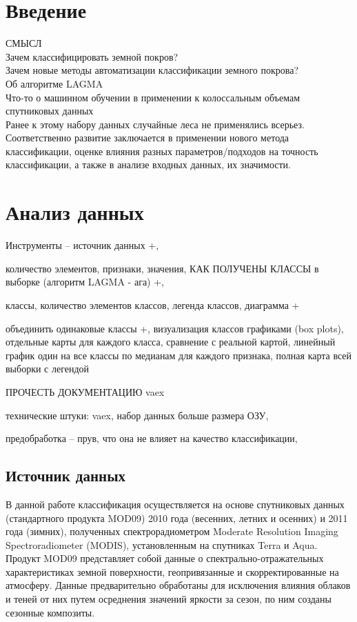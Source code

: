 \documentclass[14pt, a4paper, oneside]{extarticle}
\begin{document}
\tableofcontents
\newpage

\section{Введение}
СМЫСЛ \\
Зачем классифицировать земной покров? \\
Зачем новые методы автоматизации классификации земного покрова? \\
Об алгоритме LAGMA \\
Что-то о машинном обучении в применении к колоссальным объемам спутниковых данных \\

Ранее к этому набору данных случайные леса не применялись всерьез. Соответственно развитие заключается в применении нового метода классификации, оценке влияния разных параметров/подходов на точность классификации, а также в анализе входных данных, их значимости.

\newpage

\section{Анализ данных}
Инструменты -- источник данных +,

количество элементов, признаки, значения, КАК ПОЛУЧЕНЫ КЛАССЫ в выборке (алгоритм LAGMA - ага) +,

классы, количество элементов классов, легенда классов, диаграмма +

объединить одинаковые классы +, визуализация классов графиками (box plots), отдельные карты для каждого класса, сравнение с реальной картой, линейный график один на все классы по медианам для каждого признака, полная карта всей выборки с легендой

ПРОЧЕСТЬ ДОКУМЕНТАЦИЮ vaex

технические штуки: vaex, набор данных больше размера ОЗУ,

предобработка -- прув, что она не влияет на качество классификации,

\subsection{Источник данных}
В данной работе классификация осуществляется на основе спутниковых данных (стандартного продукта MOD09) 2010 года (весенних, летних и осенних) и 2011 года (зимних), полученных спектрорадиометром Moderate Resolution Imaging Spectroradiometer (MODIS), установленным на спутниках Terra и Aqua. Продукт MOD09 представляет собой данные о спектрально-отражательных характеристиках земной поверхности, геопривязанные и скорректированные на атмосферу. Данные предварительно обработаны для исключения влияния облаков и теней от них путем осреднения значений яркости за сезон, по ним созданы сезонные композиты.
\end{document}
